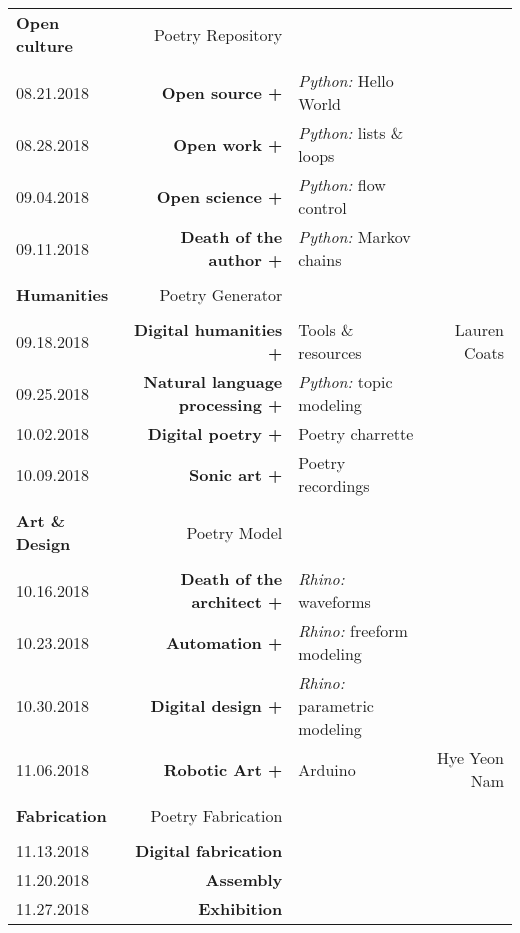 \documentclass[11pt,article,oneside]{memoir}
\begin{document}
\begin{table}[H]
\begin{tabular}{l r @{\hskip 0.1cm} l r}
\\
\normalsize
\textbf{Open culture} & Poetry Repository\\
\small
\\
08.21.2018 & \textbf{Open source +} & \emph{Python:} Hello World \\
08.28.2018 & \textbf{Open work +} & \emph{Python:} lists \& loops \\
09.04.2018 & \textbf{Open science +} & \emph{Python:} flow control \\ %
09.11.2018 & \textbf{Death of the author +} & \emph{Python:} Markov chains \\ %
\\
\normalsize

\textbf{Humanities} & Poetry Generator\\
\small
\\
09.18.2018 & \textbf{Digital humanities +} & Tools \& resources  & Lauren Coats \\
09.25.2018 & \textbf{Natural language processing +} & \emph{Python:} topic modeling \\
10.02.2018 & \textbf{Digital poetry +} & Poetry charrette \\ %
10.09.2018 & \textbf{Sonic art +} & Poetry recordings \\ %
\\
\normalsize
\textbf{Art \& Design} & Poetry Model \\
\small
\\
10.16.2018 & \textbf{Death of the architect +} & \emph{Rhino:} waveforms \\
10.23.2018 & \textbf{Automation +} & \emph{Rhino:} freeform modeling \\
10.30.2018 & \textbf{Digital design +} & \emph{Rhino:} parametric modeling \\
11.06.2018 & \textbf{Robotic Art +} & Arduino & Hye Yeon Nam \\
\\
\normalsize
\textbf{Fabrication} & Poetry Fabrication\\
\small
\\
11.13.2018 & \textbf{Digital fabrication} \\
11.20.2018 & \textbf{Assembly} \\
11.27.2018 & \textbf{Exhibition} \\ 
%
\end{tabular}
\end{table}
\end{document}

